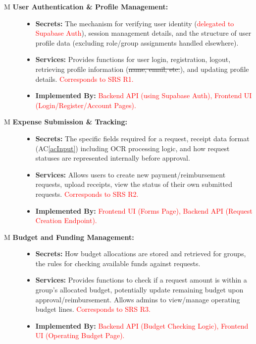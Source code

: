 \documentclass[12pt, titlepage]{article}
\newcommand{\acref}[1]{AC\ref{#1}}
\newcounter{mnum}
\newcommand{\mthemnum}{M\themnum}
\begin{document}
\begin{description}
\item[ \mthemnum \label{mUserAuth} \textbf{User Authentication \& Profile Management:}]
    \begin{itemize}
        \item \textbf{Secrets:} The mechanism for verifying user identity (\textcolor{red}{delegated to Supabase Auth}), session management details, and the structure of user profile data (excluding role/group assignments handled elsewhere).
        \item \textbf{Services:} Provides functions for user login, registration, logout, retrieving profile information (\sout{name, email, etc.}), and updating profile details. \textcolor{red}{Corresponds to SRS R1.}
        \item \textbf{Implemented By:} \textcolor{red}{Backend API (using Supabase Auth), Frontend UI (Login/Register/Account Pages).}
    \end{itemize}

\item[ \mthemnum \label{mExpenseSub} \textbf{Expense Submission \& Tracking:}]
    \begin{itemize}
        \item \textbf{Secrets:} The specific fields required for a request, receipt data format (\acref{acInput}) including OCR processing logic, and how request statuses are represented internally before approval.
        \item \textbf{Services:} Allows users to create new payment/reimbursement requests, upload receipts, view the status of their own submitted requests. \textcolor{red}{Corresponds to SRS R2.}
        \item \textbf{Implemented By:} \textcolor{red}{Frontend UI (Forms Page), Backend API (Request Creation Endpoint).}
    \end{itemize}

\item[ \mthemnum \label{mBudgetMgmt} \textbf{Budget and Funding Management:}]
    \begin{itemize}
        \item \textbf{Secrets:} How budget allocations are stored and retrieved for groups, the rules for checking available funds against requests.
        \item \textbf{Services:} Provides functions to check if a request amount is within a group's allocated budget, potentially update remaining budget upon approval/reimbursement. Allows admins to view/manage operating budget lines. \textcolor{red}{Corresponds to SRS R3.}
        \item \textbf{Implemented By:} \textcolor{red}{Backend API (Budget Checking Logic), Frontend UI (Operating Budget Page).}
    \end{itemize}


\end{description}
\end{document}
